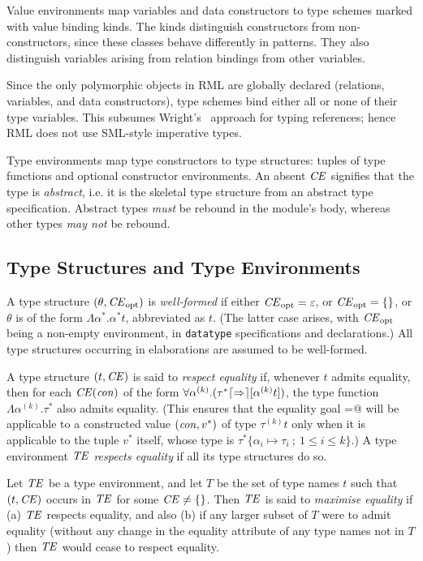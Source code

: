 Value environments map variables and data constructors to type schemes
marked with value binding kinds.
The kinds distinguish constructors from non-constructors,
since these classes behave differently in patterns.
They also distinguish variables arising from relation bindings from other
variables.

Since the only polymorphic objects in RML are globally declared
(relations, variables, and data constructors), type schemes bind either
all or none of their type variables.
This subsumes Wright's~\cite{Wright95} approach for typing references;
hence RML does not use SML-style imperative types.

Type environments map type constructors to type structures: tuples
of type functions and optional constructor environments.
An absent $\mbox{\textit{CE}}$ signifies that the type is \emph{abstract}, i.e. it is the
skeletal type structure from an abstract type specification.
Abstract types \emph{must} be rebound in the module's body,
whereas other types \emph{may not} be rebound.
%
\subsection{Type Structures and Type Environments}
A type structure $(\theta,\mbox{\textit{CE}}_{\mathrm{opt}})$ is \emph{well-formed} if either
$\mbox{\textit{CE}}_{\mathrm{opt}} = \varepsilon$, or $\mbox{\textit{CE}}_{\mathrm{opt}} = \{\}$,
or $\theta$ is of the form $\Lambda\alpha^{*}.\alpha^{*}t$,
abbreviated as $t$.
(The latter case arises, with $\mbox{\textit{CE}}_{\mathrm{opt}}$ being a non-empty environment,
in \texttt{datatype} specifications and declarations.)
All type structures occurring in elaborations are assumed to be well-formed.

A type structure $(t,\mbox{\textit{CE}})$ is said to \emph{respect equality} if,
whenever $t$ admits equality, then for each $\mbox{\textit{CE}}(\mbox{\textit{con}})$ of the form
$\forall\alpha^{(k)}.(\tau^{*}\lceil\Rightarrow\rceil[\alpha^{(k)}t])$, the type function
$\Lambda\alpha^{(k)}.\tau^{*}$ also admits equality.
(This ensures that the equality goal \verb@=@ will be applicable
to a constructed value $(\mbox{\textit{con}},v^{*})$ of type $\tau^{(k)}t$
only when it is applicable to the tuple $v^{*}$ itself, whose
type is $\tau^{*}\{\alpha_i\mapsto\tau_i ~;~ 1\leq i\leq k\}$.)
A type environment $\mbox{\textit{TE}}$ \emph{respects equality} if all its
type structures do so.

Let $\mbox{\textit{TE}}$ be a type environment, and let $T$ be the set of type names
$t$ such that $(t,\mbox{\textit{CE}})$ occurs in $\mbox{\textit{TE}}$ for some $\mbox{\textit{CE}} \neq \{\}$.
Then $\mbox{\textit{TE}}$ is said to \emph{maximise equality} if (a) $\mbox{\textit{TE}}$ respects equality,
and also (b) if any larger subset of $T$ were to admit equality
(without any change in the equality attribute of any type names not in $T$)
then $\mbox{\textit{TE}}$ would cease to respect equality.
%
